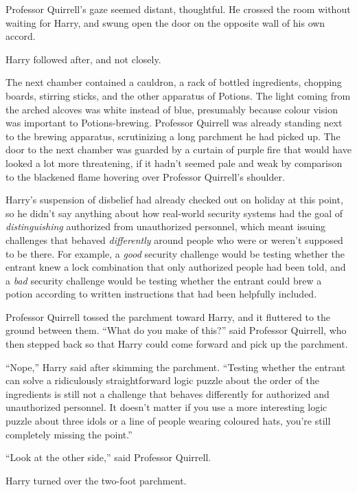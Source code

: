 Professor Quirrell’s gaze seemed distant, thoughtful. He crossed the room without waiting for Harry, and swung open the door on the opposite wall of his own accord.

Harry followed after, and not closely.

\later

The next chamber contained a cauldron, a rack of bottled ingredients, chopping boards, stirring sticks, and the other apparatus of Potions. The light coming from the arched alcoves was white instead of blue, presumably because colour vision was important to Potions-brewing. Professor Quirrell was already standing next to the brewing apparatus, scrutinizing a long parchment he had picked up. The door to the next chamber was guarded by a curtain of purple fire that would have looked a lot more threatening, if it hadn’t seemed pale and weak by comparison to the blackened flame hovering over Professor Quirrell’s shoulder.

Harry’s suspension of disbelief had already checked out on holiday at this point, so he didn’t say anything about how real-world security systems had the goal of \emph{distinguishing} authorized from unauthorized personnel, which meant issuing challenges that behaved \emph{differently} around people who were or weren’t supposed to be there. For example, a \emph{good} security challenge would be testing whether the entrant knew a lock combination that only authorized people had been told, and a \emph{bad} security challenge would be testing whether the entrant could brew a potion according to written instructions that had been helpfully included.

Professor Quirrell tossed the parchment toward Harry, and it fluttered to the ground between them. “What do you make of this?” said Professor Quirrell, who then stepped back so that Harry could come forward and pick up the parchment.

“Nope,” Harry said after skimming the parchment. “Testing whether the entrant can solve a ridiculously straightforward logic puzzle about the order of the ingredients is still not a challenge that behaves differently for authorized and unauthorized personnel. It doesn’t matter if you use a more interesting logic puzzle about three idols or a line of people wearing coloured hats, you’re still completely missing the point.”

“Look at the other side,” said Professor Quirrell.

Harry turned over the two-foot parchment.

